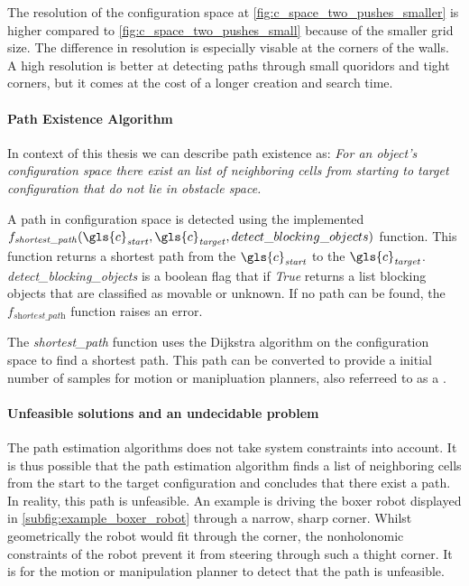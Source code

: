 The resolution of the configuration space at \cref{fig:c_space_two_pushes_smaller} is higher compared to \cref{fig:c_space_two_pushes_small} because of the smaller grid size. The difference in resolution is especially visable at the corners of the walls. A high resolution is better at detecting paths through small quoridors and tight corners, but it comes at the cost of a longer creation and search time.

\paragraph{Path Existence Algorithm}
In context of this thesis we can describe path existence as: \textit{For an object's configuration space there exist an list of neighboring cells from starting to target configuration that do not lie in obstacle space.\bs}

A path in configuration space is detected using the implemented $f_\mathit{shortest\_path}(\gls{c}_\mathit{start}, \gls{c}_\mathit{target}, detect\_blocking\_objects)$ function. This function returns a shortest path from the $\gls{c}_\mathit{start}$ to the $\gls{c}_\mathit{target}$. \textit{detect\_blocking\_objects} is a boolean flag that if \textit{True} returns a list blocking objects that are classified as movable or unknown. If no path can be found, the $f_\textit{shortest\_path}$ function raises an error.\bs

The \textit{shortest\_path} function uses the Dijkstra algorithm 
\cite{dijkstra_note_1959} on the configuration space to find a shortest path. This path can be converted to provide a initial number of samples for motion or manipluation planners, also referreed to as a .

\paragraph{Unfeasible solutions and an undecidable problem}
The path estimation algorithms does not take system constraints into account. It is thus possible that the path estimation algorithm finds a list of neighboring cells from the start to the target configuration and concludes that there exist a path. In reality, this path is unfeasible. An example is driving the boxer robot displayed in \cref{subfig:example_boxer_robot} through a narrow, sharp corner. Whilst geometrically the robot would fit through the corner, the nonholonomic constraints of the robot prevent it from steering through such a thight corner. It is for the motion or manipulation planner to detect that the path is unfeasible.\\

